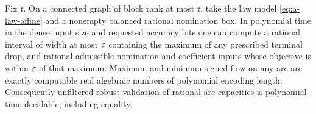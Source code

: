 \begin{theorem}
\label{thm:a-law-polynomial}
Fix $\mathfrak r$. On a connected graph of block rank at most
$\mathfrak r$, take the law model \cref{eq:a-law-affine} and a nonempty
balanced rational nomination box. In polynomial time in the dense
input size and requested accuracy bits one can compute a rational
interval of width at most $\varepsilon$ containing the maximum of any prescribed
terminal drop, and rational admissible nomination and coefficient inputs
whose objective is within $\varepsilon$ of that maximum. Maximum and minimum
signed flow on any arc are exactly computable real algebraic numbers
of polynomial encoding length. Consequently unfiltered robust validation
of rational arc capacities is polynomial-time decidable, including equality.
\end{theorem}
